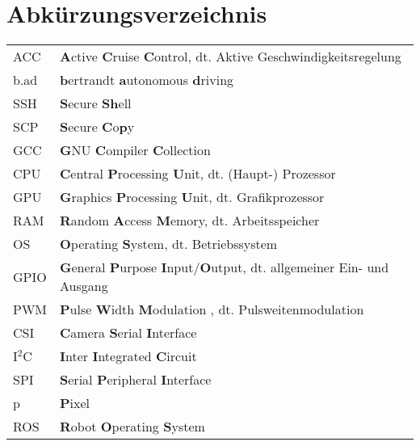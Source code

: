 
\cleardoublepage
{}
{}
\chapter*{Abkürzungsverzeichnis}
\label{section-abbrevs}
\begin{tabularx}{\textwidth}{lX}
  ACC & \textbf{A}ctive \textbf{C}ruise \textbf{C}ontrol, dt. Aktive Geschwindigkeitsregelung\\
  b.ad & \textbf{b}ertrandt \textbf{a}utonomous \textbf{d}riving\\
  SSH & \textbf{S}ecure \textbf{Sh}ell\\
  SCP & \textbf{S}ecure \textbf{C}o\textbf{p}y\\
  GCC & \textbf{G}NU \textbf{C}ompiler \textbf{C}ollection\\
  CPU & \textbf{C}entral \textbf{P}rocessing \textbf{U}nit, dt. (Haupt-) Prozessor\\
  GPU & \textbf{G}raphics \textbf{P}rocessing \textbf{U}nit, dt. Grafikprozessor\\
  RAM & \textbf{R}andom \textbf{A}ccess \textbf{M}emory, dt. Arbeitsspeicher\\
  OS & \textbf{O}perating \textbf{S}ystem, dt. Betriebssystem\\
  GPIO & \textbf{G}eneral \textbf{P}urpose \textbf{I}nput/\textbf{O}utput, dt. allgemeiner Ein- und Ausgang\\
  PWM & \textbf{P}ulse \textbf{W}idth \textbf{M}odulation , dt. Pulsweitenmodulation\\
  CSI & \textbf{C}amera \textbf{S}erial \textbf{I}nterface \\
  I$^2$C & \textbf{I}nter \textbf{I}ntegrated \textbf{C}ircuit \\  
  SPI & \textbf{S}erial \textbf{P}eripheral \textbf{I}nterface \\
  p & \textbf{P}ixel\\
  ROS & \textbf{R}obot \textbf{O}perating \textbf{S}ystem\\
\end{tabularx}